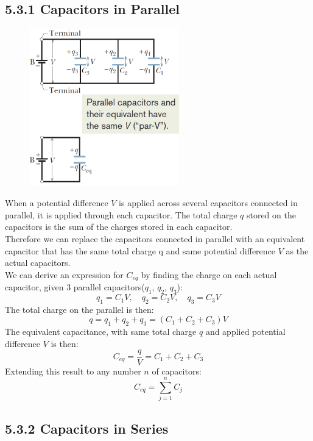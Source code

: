 \documentclass[12pt, a4paper]{article}
\begin{document}
		\subsection*{5.3.1 Capacitors in Parallel}
		
		\begin{figure}
			\centering
			\includegraphics[width=6.5cm]{Physics2_PNGs/parallel-capacitors.png}
			\caption*{}
			\label{fig:parallel-capacitors.png}
		\end{figure}
		When a potential difference $V$ is applied across several capacitors connected in parallel, it is applied through each capacitor. The total charge $q$ stored on the capacitors is the sum of the charges stored in each capacitor.\\
		Therefore we can replace the capacitors connected in parallel with an equivalent capacitor that has the same total charge q and same potential difference $V$ as the actual capacitors. \\
		We can derive an expression for $C_{eq}$ by finding the charge on each actual capacitor, given 3 parallel capacitors($q_1$, $q_2$, $q_3$):
		\[
			q_1 = C_1 V, \quad q_2 = C_2 V, \quad q_3 = C_3 V
		\]
		The total charge on the parallel is then:
		\[
			q = q_1 + q_2 + q_3 = (C_1 + C_2 + C_3)V
		\]
		The equivalent capacitance, with same total charge $q$ and applied potential difference $V$ is then:
		\[
			C_{eq} = \frac{q}{V} = C_1 + C_2 + C_3
		\]
		Extending this result to any number $n$ of capacitors:
		\begin{equation*}
			C_{eq} = \sum_{j=1}^{n} C_j
			\tag{$n$ Capacitors in Parallel, 5-18}
		\end{equation*}
		
		
		
		\newpage
		
		\subsection*{5.3.2 Capacitors in Series}
		
\end{document}
